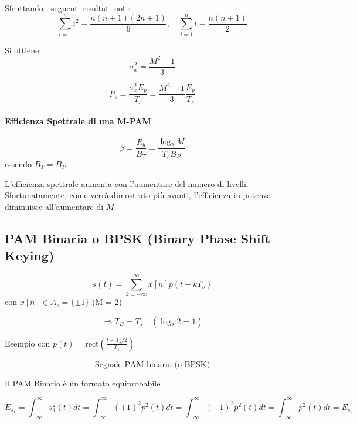 Sfruttando i seguenti risultati noti:
\[
\sum_{i=1}^{n} i^2 = \frac{n(n+1)(2n+1)}{6}, \quad \sum_{i=1}^{n} i = \frac{n(n+1)}{2}
\]

Si ottiene:
\[
\sigma_x^2 = \frac{M^2 - 1}{3}
\]

\[
P_s = \frac{\sigma_x^2 E_p}{T_s} = \frac{M^2 - 1}{3} \frac{E_p}{T_s}
\]

\paragraph*{Efficienza Spettrale di una M-PAM}
\[
\beta = \frac{R_b}{B_T} = \frac{\log_2 M}{T_s B_P}
\]
essendo \( B_T = B_P \), 

L'efficienza spettrale aumenta con l'aumentare del numero di livelli. Sfortunatamente, come verrà dimostrato più avanti, l'efficienza in potenza diminuisce all'aumentare di \( M \).

\subsection*{PAM Binaria o BPSK (Binary Phase Shift Keying)}


\[
s(t) = \sum_{k=-\infty}^{\infty} x[n] p(t - kT_s)
\]
con \( x[n] \in A_s = \{\pm 1\} \) (M = 2)

\[
\Rightarrow T_B = T_s \quad (\log_2 2 = 1)
\]

Esempio con \( p(t) = \text{rect}\left(\frac{t-T_s/2}{T_s}\right) \)

\begin{center}
 
\end{center}
\[
\text{Segnale PAM binario (o BPSK)}
\]

Il PAM Binario è un formato equiprobabile

\[
E_{s_1} = \int_{-\infty}^{\infty} s_1^2(t) dt = \int_{-\infty}^{\infty} \left( +1 \right)^2 p^2(t) dt =  \int_{-\infty}^{\infty} \left( -1 \right)^2 p^2(t) dt = \int_{-\infty}^{\infty}  p^2(t) dt  = E_{s_2}
\]


